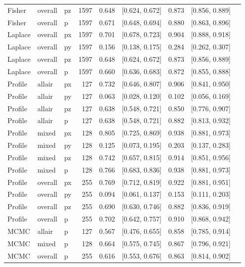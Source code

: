 \documentclass[a4paper,11pt]{article}
\begin{document}
\begin{table}[H]
\begin{tabular}{lllrrrrrr}
Fisher & overall & pz & 1597 & 0.648 & [0.624, 0.672] & 0.873 & [0.856, 0.889] \\
Fisher & overall & p & 1597 & 0.671 & [0.648, 0.694] & 0.880 & [0.863, 0.896] \\
Laplace & overall & px & 1597 & 0.701 & [0.678, 0.723] & 0.904 & [0.888, 0.918] \\
Laplace & overall & py & 1597 & 0.156 & [0.138, 0.175] & 0.284 & [0.262, 0.307] \\
Laplace & overall & pz & 1597 & 0.648 & [0.624, 0.672] & 0.873 & [0.856, 0.889] \\
Laplace & overall & p & 1597 & 0.660 & [0.636, 0.683] & 0.872 & [0.855, 0.888] \\
Profile & allair & px & 127 & 0.732 & [0.646, 0.807] & 0.906 & [0.841, 0.950] \\
Profile & allair & py & 127 & 0.063 & [0.028, 0.120] & 0.102 & [0.056, 0.169] \\
Profile & allair & pz & 127 & 0.638 & [0.548, 0.721] & 0.850 & [0.776, 0.907] \\
Profile & allair & p & 127 & 0.638 & [0.548, 0.721] & 0.882 & [0.813, 0.932] \\
Profile & mixed & px & 128 & 0.805 & [0.725, 0.869] & 0.938 & [0.881, 0.973] \\
Profile & mixed & py & 128 & 0.125 & [0.073, 0.195] & 0.203 & [0.137, 0.283] \\
Profile & mixed & pz & 128 & 0.742 & [0.657, 0.815] & 0.914 & [0.851, 0.956] \\
Profile & mixed & p & 128 & 0.766 & [0.683, 0.836] & 0.938 & [0.881, 0.973] \\
Profile & overall & px & 255 & 0.769 & [0.712, 0.819] & 0.922 & [0.881, 0.951] \\
Profile & overall & py & 255 & 0.094 & [0.061, 0.137] & 0.153 & [0.111, 0.203] \\
Profile & overall & pz & 255 & 0.690 & [0.630, 0.746] & 0.882 & [0.836, 0.919] \\
Profile & overall & p & 255 & 0.702 & [0.642, 0.757] & 0.910 & [0.868, 0.942] \\
MCMC & allair & p & 127 & 0.567 & [0.476, 0.655] & 0.858 & [0.785, 0.914] \\
MCMC & mixed & p & 128 & 0.664 & [0.575, 0.745] & 0.867 & [0.796, 0.921] \\
MCMC & overall & p & 255 & 0.616 & [0.553, 0.676] & 0.863 & [0.814, 0.902] \\
\bottomrule
\end{tabular}
\end{table}
\end{document}

